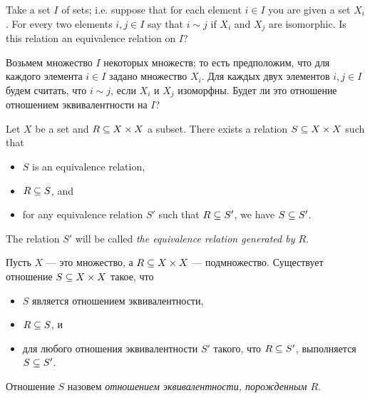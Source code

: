 \documentclass[CT4S-EN-RU]{subfiles}
\begin{document}
\begin{exerciseENG}
Take a set $I$ of sets; i.e. suppose that for each element $i\in I$ you are given a set $X_i$. For every two elements $i,j\in I$ say that $i\sim j$ if $X_i$ and $X_j$ are isomorphic. Is this relation an equivalence relation on $I$?  
\end{exerciseENG}

\begin{exerciseRUS}
Возьмем множество $I$ некоторых множеств; то есть предположим, что для каждого элемента $i\in I$ задано множество $X_i$. Для каждых двух элементов $i,j\in I$ будем считать, что $i\sim j$, если $X_i$ и $X_j$ изоморфны. Будет ли это отношение отношением эквивалентности на $I$?
\end{exerciseRUS}

\begin{lemmaENG}\label{lemma:generating ERs}
Let $X$ be a set and $R\ss X\times X$ a subset. There exists a relation $S\ss X\times X$ such that
\begin{itemize}
\item $S$ is an equivalence relation,
\item $R\ss S$, and
\item for any equivalence relation $S'$ such that $R\ss S'$, we have $S\ss S'$.
\end{itemize}
The relation $S'$ will be called {\em the equivalence relation generated by $R$}.
\end{lemmaENG}

\begin{lemmaRUS}\label{lemma:generating ERs}
Пусть $X$ — это множество, а $R\ss X\times X$ — подмножество. Существует отношение $S\ss X\times X$ такое, что
\begin{itemize}
\item $S$ является отношением эквивалентности,
\item $R\ss S$, и
\item для любого отношения эквивалентности $S'$ такого, что $R\ss S'$, выполняется $S\ss S'$.
\end{itemize}
Отношение $S$ назовем {\em отношением эквивалентности, порожденным $R$}.
\end{lemmaRUS}
\end{document}
